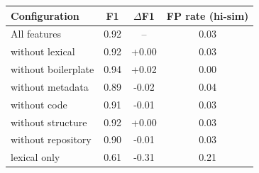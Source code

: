 \begin{tabular}{lccc}
\toprule
Configuration & F1 & $\Delta$F1 & FP rate (hi-sim) \\
\midrule
All features & 0.92 & -- & 0.03 \\
without lexical & 0.92 & +0.00 & 0.03 \\
without boilerplate & 0.94 & +0.02 & 0.00 \\
without metadata & 0.89 & -0.02 & 0.04 \\
without code & 0.91 & -0.01 & 0.03 \\
without structure & 0.92 & +0.00 & 0.03 \\
without repository & 0.90 & -0.01 & 0.03 \\
lexical only & 0.61 & -0.31 & 0.21 \\
\bottomrule
\end{tabular}

